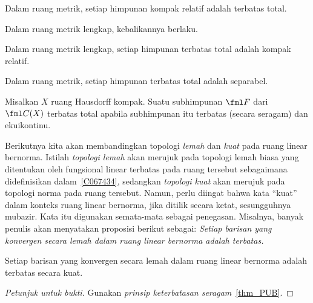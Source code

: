 \begin{prop} Dalam ruang metrik, setiap himpunan kompak relatif adalah terbatas total.
\end{prop}

Dalam ruang metrik lengkap, kebalikannya berlaku.

\begin{prop} Dalam ruang metrik lengkap, setiap himpunan terbatas total adalah kompak relatif.
\end{prop}

\begin{prop} Dalam ruang metrik, setiap himpunan terbatas total adalah separabel.
\end{prop}

\begin{thm}\label{AAThm} Misalkan $X$ ruang Hausdorff kompak. Suatu subhimpunan $\fml F$
dari $\fml C(X)$ terbatas total apabila subhimpunan itu terbatas (secara seragam) dan ekuikontinu.
\end{thm}

Berikutnya kita akan membandingkan topologi \emph{lemah} dan \emph{kuat} pada ruang linear bernorma.
Istilah
\emph{topologi lemah} akan merujuk pada topologi lemah biasa yang ditentukan oleh fungsional linear terbatas
pada ruang tersebut sebagaimana didefinisikan dalam~\ref{C067434}, sedangkan \emph{topologi kuat} akan merujuk pada topologi norma pada ruang tersebut.
Namun, perlu diingat bahwa kata ``kuat'' dalam konteks ruang linear bernorma, jika ditilik secara ketat,
sesungguhnya mubazir.  Kata itu digunakan semata-mata sebagai penegasan.  Misalnya, banyak penulis akan menyatakan proposisi berikut sebagai:
\emph{Setiap barisan yang konvergen secara lemah dalam ruang linear bernorma adalah terbatas.}

\begin{prop} Setiap barisan yang konvergen secara lemah dalam ruang linear bernorma adalah terbatas secara kuat.
\end{prop}

\begin{proof}[\emph{Petunjuk untuk bukti}] Gunakan \emph{prinsip keterbatasan seragam}~\ref{thm_PUB}. \ns
\end{proof}


